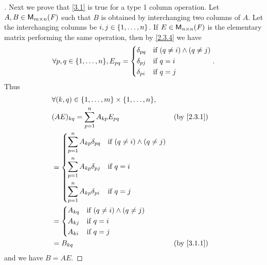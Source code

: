 \begin{proof}[]
	Next we prove that \cref{3.1} is true for a type 1 column operation.
	Let \(A, B \in \mathsf{M}_{{m} \times n}({\mathit{F}})\) such that \(B\) is obtained by interchanging two columns of \(A\).
	Let the interchanging columns be \(i, j \in \left\lbrace1, \dots, n\right\rbrace\).
	If \(E \in \mathsf{M}_{{n} \times n}({\mathit{F}})\) is the elementary matrix performing the same operation, then by \cref{2.3.4} we have
	\[
		\forall p, q \in \set{1, \dots, n}, E_{p q} = \begin{dcases}
			\delta_{p q} & \text{if } (q \neq i) \land (q \neq j) \\
			\delta_{p j} & \text{if } q = i                       \\
			\delta_{p i} & \text{if } q = j
		\end{dcases}.
	\]
	Thus
	\begin{align*}
		 & \forall (k, q) \in \set{1, \dots, m} \times \set{1, \dots, n},                                  \\
		 & (AE)_{k q} = \sum_{p = 1}^n A_{k p} E_{p q}                                     &  & \by{2.3.1} \\
		 & = \begin{dcases}
			     \sum_{p = 1}^n A_{k p} \delta_{p q} & \text{if } (q \neq i) \land (q \neq j) \\
			     \sum_{p = 1}^n A_{k p} \delta_{p j} & \text{if } q = i                       \\
			     \sum_{p = 1}^n A_{k p} \delta_{p i} & \text{if } q = j
		     \end{dcases}                  \\
		 & = \begin{dcases}
			     A_{k q} & \text{if } (q \neq i) \land (q \neq j) \\
			     A_{k j} & \text{if } q = i                       \\
			     A_{k i} & \text{if } q = j
		     \end{dcases}                                              \\
		 & = B_{k q}                                                                       &  & \by{3.1.1}
	\end{align*}
	and we have \(B = AE\).


\end{proof}
